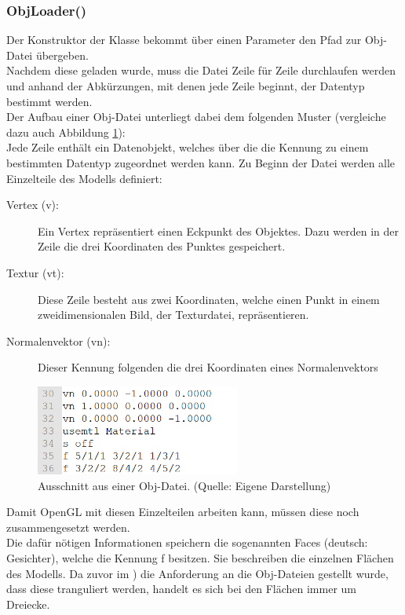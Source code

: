 \subsubsection{ObjLoader()}\label{method:objloader}
Der Konstruktor der Klasse bekommt über einen Parameter den Pfad zur Obj-Datei übergeben. \\
Nachdem diese geladen wurde, muss die Datei Zeile für Zeile durchlaufen werden und anhand der Abkürzungen, mit denen jede Zeile beginnt, der Datentyp bestimmt werden. \\
Der Aufbau einer Obj-Datei unterliegt dabei dem folgenden Muster (vergleiche dazu auch Abbildung \ref{fig:obj-datei}):\\
Jede Zeile enthält ein Datenobjekt, welches über die die Kennung zu einem bestimmten Datentyp zugeordnet werden kann. 
Zu Beginn der Datei werden alle Einzelteile des Modells definiert:
\begin{description}
\item[Vertex (v):] Ein Vertex repräsentiert einen Eckpunkt des Objektes. Dazu werden in der Zeile die drei Koordinaten des Punktes gespeichert.
\item[Textur (vt):] Diese Zeile besteht aus zwei Koordinaten, welche einen Punkt in einem zweidimensionalen Bild, der Texturdatei, repräsentieren.
\item[Normalenvektor (vn):] Dieser Kennung folgenden die drei Koordinaten eines Normalenvektors  
\end{description}
\begin{figure}
\centering
\includegraphics[width=0.6\textwidth]{Abbildungen/obj-datei.png}
\caption[Obj-Dateiformat]{Ausschnitt aus einer Obj-Datei. (Quelle: Eigene Darstellung)}
\label{fig:obj-datei}
\end{figure}
Damit OpenGL mit diesen Einzelteilen arbeiten kann, müssen diese noch zusammengesetzt werden. \\
Die dafür nötigen Informationen speichern die sogenannten Faces (deutsch: \glqq Gesichter\grqq ), welche die Kennung f besitzen. Sie beschreiben die einzelnen Flächen des Modells. Da zuvor im ) die Anforderung an die Obj-Dateien gestellt wurde, dass diese tranguliert werden, handelt es sich bei den Flächen immer um Dreiecke. \\ 
